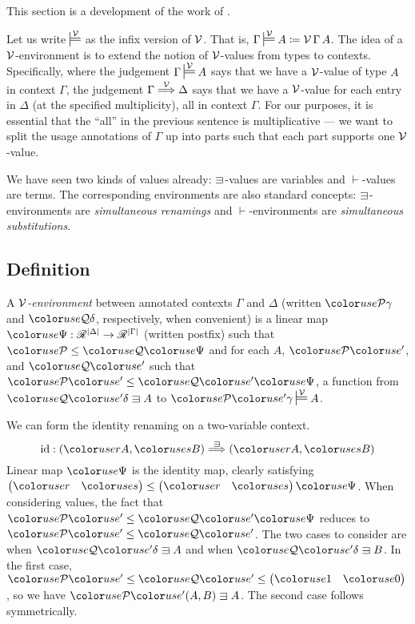 This section is a development of the work of \citet{WA20}.

Let us write $\sdtstile{}\V$ as the infix version of $\mathcal V$.
That is, $\Gamma \sdtstile{}\V A \coloneqq \V\,\Gamma\,A$.
The idea of a $\mathcal V$-environment is to extend the notion of $\mathcal V$-values from
types to contexts.
Specifically, where the judgement $\Gamma \sdtstile{}\V A$ says that we
have a $\mathcal V$-value of type $A$ in context $\Gamma$, the judgement
$\Gamma \stackrel{\mathcal V}\Longrightarrow \Delta$ says that we have a $\mathcal V$-value for each entry in
$\Delta$ (at the specified multiplicity), all in context $\Gamma$.
For our purposes, it is essential that the ``all'' in the previous sentence is
multiplicative --- we want to split the usage annotations of $\Gamma$ up into
parts such that each part supports one $\mathcal V$-value.

We have seen two kinds of values already: $\sqni$-values are variables and
$\vdash$-values are terms.
The corresponding environments are also standard concepts: $\sqni$-environments
are \emph{simultaneous renamings} and $\vdash$-environments are
\emph{simultaneous substitutions}.

\subsection{Definition}

\begin{definition}\label{def:lr-env}
  A \emph{$\mathcal V$-environment} between annotated contexts $\Gamma$ and $\Delta$
  (written $\grP\gamma$ and $\grQ\delta$, respectively, when convenient)
  is a linear map $\gr\Psi : \Ann^{\size\Delta} \to \Ann^{\size\Gamma}$ (written
  postfix) such that $\grP \leq \grQ\gr\Psi$ and for each $A$, $\grPprime$, and
  $\grQprime$ such that $\grPprime \leq \grQprime\gr\Psi$, a function from
  $\grQprime\delta \sqni A$ to $\grPprime\gamma \sdtstile{}\V A$.
\end{definition}

\begin{example}
  We can form the identity renaming on a two-variable context.
  \[
    \id : \plr{\gr rA, \gr sB} \env\sqni \plr{\gr rA, \gr sB}
  \]
  Linear map $\gr\Psi$ is the identity map, clearly satisfying
  \(
    \begin{pmatrix} \gr r & \gr s \end{pmatrix} \leq
    \begin{pmatrix} \gr r & \gr s \end{pmatrix}\gr\Psi
  \).
  When considering values, the fact that $\grPprime \leq \grQprime\gr\Psi$
  reduces to $\grPprime \leq \grQprime$.
  The two cases to consider are when $\grQprime\delta \sqni A$ and when
  $\grQprime\delta \sqni B$.
  In the first case, $\grPprime \leq \grQprime \leq
  \begin{pmatrix} \gr1 & \gr0 \end{pmatrix}$, so we have
  $\grPprime\plr{A, B} \sqni A$.
  The second case follows symmetrically.
\end{example}

